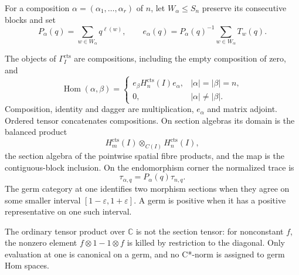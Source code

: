 \begin{definition}
For a composition $\alpha=(\alpha_1,\ldots,\alpha_r)$ of $n$, let
$W_\alpha\leq S_n$ preserve its consecutive blocks and set
\[
 P_\alpha(q)=\sum_{w\in W_\alpha}q^{\ell(w)},\qquad
 e_\alpha(q)=P_\alpha(q)^{-1}\sum_{w\in W_\alpha}T_w(q).
\]

The objects of $\Gamma_I^{\mathrm{cts}}$ are compositions, including the
empty composition of zero, and
\[
 \operatorname{Hom}(\alpha,\beta)=
 \begin{cases}
 e_\beta H_n^{\mathrm{cts}}(I)e_\alpha,&|\alpha|=|\beta|=n,\\
 0,&|\alpha|\neq|\beta|.
 \end{cases}
\]
Composition, identity and dagger are multiplication, $e_\alpha$ and matrix
adjoint.  Ordered tensor concatenates compositions.  On section algebras its
domain is the balanced product
\[
 H_m^{\mathrm{cts}}(I)\otimes_{C(I)}H_n^{\mathrm{cts}}(I),
\]
the section algebra of the pointwise spatial fibre products, and the map is
the contiguous-block inclusion.  On the endomorphism corner the normalized
trace is
\[
 \tau_{\alpha,q}=P_\alpha(q)\tau_{n,q}.
\]
The germ category at one identifies two morphism sections when they agree on
some smaller interval $[1-\varepsilon,1+\varepsilon]$.  A germ is positive
when it has a positive representative on one such interval.
\end{definition}
\begin{scope}
The ordinary tensor product over $\mathbb C$ is not the section tensor: for
nonconstant $f$, the nonzero element $f\otimes1-1\otimes f$ is killed by
restriction to the diagonal.  Only evaluation at one is canonical on a germ,
and no C*-norm is assigned to germ Hom spaces.
\end{scope}

